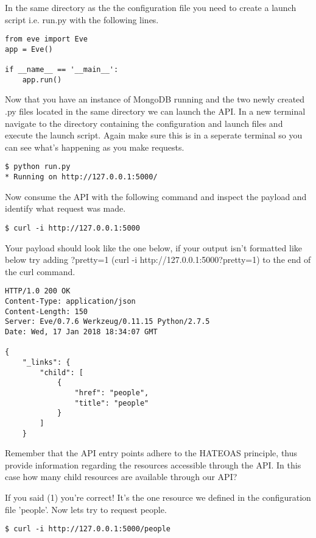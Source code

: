 \documentclass{article}
\begin{document}
In the same directory as the the configuration file you need to create
a launch script i.e. run.py with the following lines.

\begin{verbatim}
from eve import Eve
app = Eve()

if __name__ == '__main__':
    app.run()
\end{verbatim}

Now that you have an instance of MongoDB running and the two newly
created .py files located in the same directory we can launch the
API. In a new terminal navigate to the directory containing the
configuration and launch files and execute the launch script. Again
make sure this is in a seperate terminal so you can see what's
happening as you make requests.

\begin{verbatim}
$ python run.py
* Running on http://127.0.0.1:5000/
\end{verbatim}

Now consume the API with the following command and inspect the payload
and identify what request was made.

\begin{verbatim}
$ curl -i http://127.0.0.1:5000
\end{verbatim}

Your payload should look like the one below, if your output isn't
formatted like below try adding ?pretty=1 (curl -i
http://127.0.0.1:5000?pretty=1) to the end of the curl command.
\begin{verbatim}
HTTP/1.0 200 OK
Content-Type: application/json
Content-Length: 150
Server: Eve/0.7.6 Werkzeug/0.11.15 Python/2.7.5
Date: Wed, 17 Jan 2018 18:34:07 GMT

{
    "_links": {
        "child": [
            {
                "href": "people",
                "title": "people"
            }
        ]
    }
\end{verbatim}

Remember that the API entry points adhere to the HATEOAS principle,
thus provide information regarding the resources accessible through
the API. In this case how many child resources are available through
our API?

\vspace{5mm}

If you said (1) you're correct! It's the one resource we defined in
the configuration file 'people'. Now lets try to request people.

\begin{verbatim}
$ curl -i http://127.0.0.1:5000/people
\end{verbatim}
\end{document}

